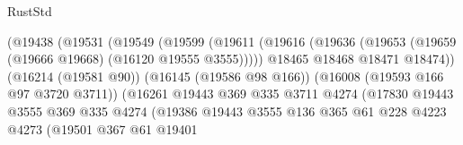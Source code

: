 \begin{lexlean}{RustStd}
\begin{coremodule}
                                          (@19438
                                            (@19531
                                              (@19549
                                                (@19599
                                                  (@19611
                                                    (@19616
                                                      (@19636
                                                        (@19653
                                                          (@19659
                                                            (@19666 @19668)
                                                            (@16120 @19555 @3555)))))
                                                    @18465
                                                    @18468
                                                    @18471
                                                    @18474))
                                                (@16214 (@19581 @90))
                                                (@16145 (@19586 @98 @166))
                                                (@16008 (@19593 @166 @97 @3720 @3711))
                                                (@16261
                                                  @19443
                                                  @369
                                                  @335
                                                  @3711
                                                  @4274
                                                  (@17830
                                                    @19443
                                                    @3555
                                                    @369
                                                    @335
                                                    @4274
                                                    (@19386
                                                      @19443
                                                      @3555
                                                      @136
                                                      @365
                                                      @61
                                                      @228
                                                      @4223
                                                      @4273
                                                      (@19501
                                                        @367
                                                        @61
                                                        @19401

\end{coremodule}
\end{lexlean}
